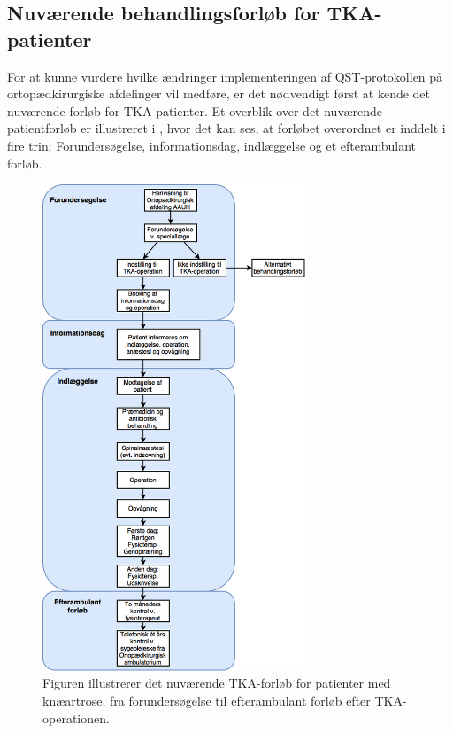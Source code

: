 \subsection{Nuværende behandlingsforløb for TKA-patienter}
For at kunne vurdere hvilke ændringer implementeringen af QST-protokollen på ortopædkirurgiske afdelinger vil medføre, er det nødvendigt først at kende det nuværende forløb for TKA-patienter. Et overblik over det nuværende patientforløb er illustreret i , hvor det kan ses, at forløbet overordnet er inddelt i fire trin: Forundersøgelse, informationsdag, indlæggelse og et efterambulant forløb. 

\begin{figure}[H] 
	\begin{center}
		\includegraphics[width=0.7\textwidth]{figures/ORG/nuTKAforlob}
	\end{center}
	\caption{Figuren illustrerer det nuværende TKA-forløb for patienter med knæartrose, fra forundersøgelse til efterambulant forløb efter TKA-operationen. \citep{pritka2015}} 
	\label{nuTKAforlob} 
\end{figure} \vspace{-.25cm}
